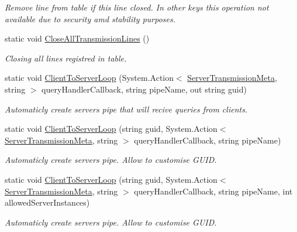 \begin{DoxyCompactItemize}
\begin{DoxyCompactList}\small\item\em Remove line from table if this line closed. In other keys this operation not available due to security amd stability purposes. \end{DoxyCompactList}\item 
static void \mbox{\hyperlink{class_pipes_provider_1_1_a_p_i_aeca3d6eddfa3446b8e5601ee85461f63}{Close\+All\+Transmission\+Lines}} ()
\begin{DoxyCompactList}\small\item\em Closing all lines registred in table. \end{DoxyCompactList}\item 
static void \mbox{\hyperlink{class_pipes_provider_1_1_a_p_i_a99feebefadd9a40a3c1fa7175324d950}{Client\+To\+Server\+Loop}} (System.\+Action$<$ \mbox{\hyperlink{class_pipes_provider_1_1_server_transmission_meta}{Server\+Transmission\+Meta}}, string $>$ query\+Handler\+Callback, string pipe\+Name, out string guid)
\begin{DoxyCompactList}\small\item\em Automaticly create server\textquotesingle{}s pipe that will recive queries from clients. \end{DoxyCompactList}\item 
static void \mbox{\hyperlink{class_pipes_provider_1_1_a_p_i_a06ee04a0e80238a176b7b2cac3f6bb4b}{Client\+To\+Server\+Loop}} (string guid, System.\+Action$<$ \mbox{\hyperlink{class_pipes_provider_1_1_server_transmission_meta}{Server\+Transmission\+Meta}}, string $>$ query\+Handler\+Callback, string pipe\+Name)
\begin{DoxyCompactList}\small\item\em Automaticly create server\textquotesingle{}s pipe. Allow to customise G\+U\+ID. \end{DoxyCompactList}\item 
static void \mbox{\hyperlink{class_pipes_provider_1_1_a_p_i_a740e60d5cfd04fcc434e05b40910e493}{Client\+To\+Server\+Loop}} (string guid, System.\+Action$<$ \mbox{\hyperlink{class_pipes_provider_1_1_server_transmission_meta}{Server\+Transmission\+Meta}}, string $>$ query\+Handler\+Callback, string pipe\+Name, int allowed\+Server\+Instances)
\begin{DoxyCompactList}\small\item\em Automaticly create server\textquotesingle{}s pipe. Allow to customise G\+U\+ID. \end{DoxyCompactList}\item 

\end{DoxyCompactItemize}
